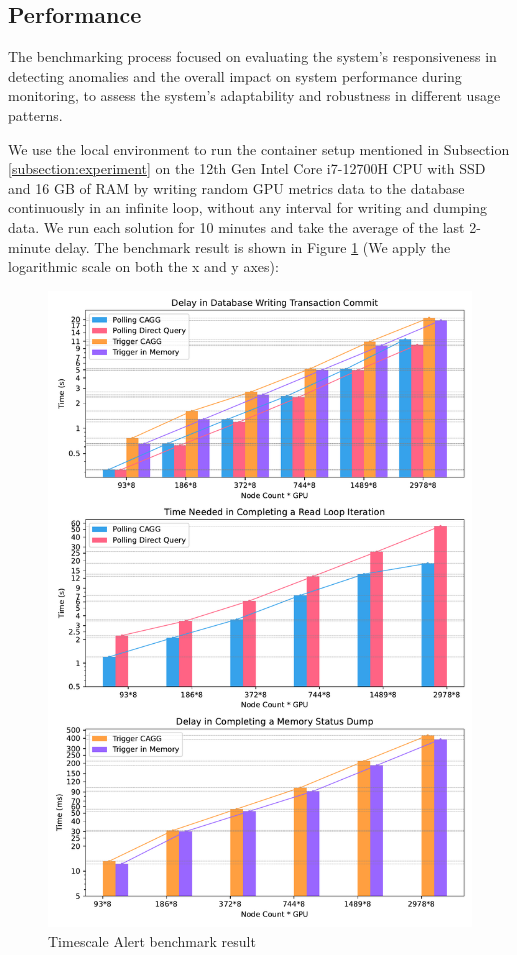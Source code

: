 \subsection{Performance}
\label{subsec:performance}
The benchmarking process focused on evaluating the system's responsiveness in detecting anomalies and the overall impact on system performance during monitoring, to assess the system's adaptability and robustness in different usage patterns.

We use the local environment to run the container setup mentioned in Subsection \ref{subsection:experiment} on the 12th Gen Intel Core i7-12700H CPU with SSD and 16 GB of RAM by writing random GPU metrics data to the database continuously in an infinite loop, without any interval for writing and dumping data. We run each solution for 10 minutes and take the average of the last 2-minute delay. The benchmark result is shown in Figure \ref{fig_benchmark} (We apply the logarithmic scale on both the x and y axes):

\begin{figure}[H]
    \centering
    \includegraphics[width=1\textwidth]{figures/benchmark-data.pdf}
    \caption{Timescale Alert benchmark result}
    \label{fig_benchmark}
\end{figure}

